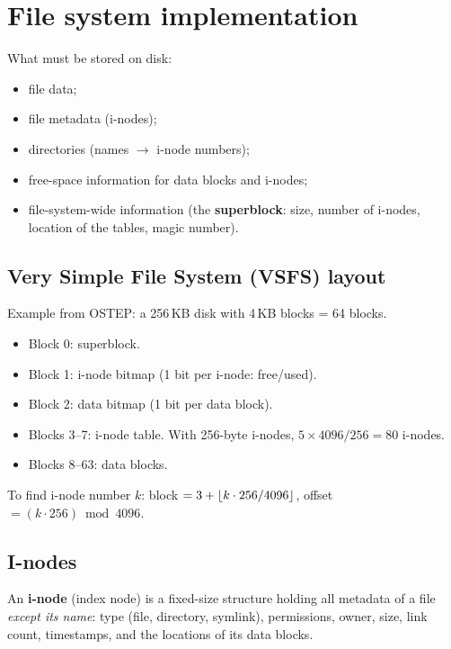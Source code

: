 \section{File system implementation}

What must be stored on disk:
\begin{itemize}
  \item file data;
  \item file metadata (i-nodes);
  \item directories (names $\to$ i-node numbers);
  \item free-space information for data blocks and i-nodes;
  \item file-system-wide information (the \textbf{superblock}: size, number of i-nodes, location
    of the tables, magic number).
\end{itemize}

\subsection{Very Simple File System (VSFS) layout}
Example from OSTEP: a 256\,KB disk with 4\,KB blocks = 64 blocks.
\begin{center}
\end{center}
\begin{itemize}
  \item Block 0: superblock.
  \item Block 1: i-node bitmap (1 bit per i-node: free/used).
  \item Block 2: data bitmap (1 bit per data block).
  \item Blocks 3--7: i-node table. With 256-byte i-nodes, $5 \times 4096/256 = 80$ i-nodes.
  \item Blocks 8--63: data blocks.
\end{itemize}
To find i-node number $k$: block $= 3 + \left\lfloor k \cdot 256 / 4096 \right\rfloor$, offset $= (k \cdot 256) \bmod 4096$.

\subsection{I-nodes}
An \textbf{i-node} (index node) is a fixed-size structure holding all metadata of a file
\emph{except its name}: type (file, directory, symlink), permissions, owner, size, link count,
timestamps, and the locations of its data blocks.

